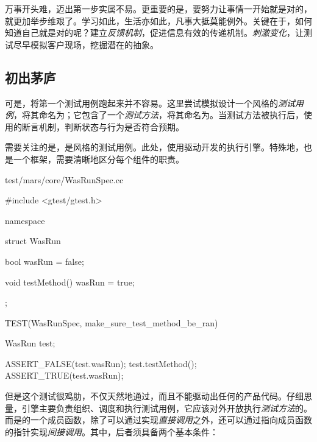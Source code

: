 \begin{content}

万事开头难，迈出第一步实属不易。更重要的是，要努力让事情一开始就是对的，就更加举步维艰了。学习如此，生活亦如此，凡事大抵莫能例外。关键在于，如何知道自己就是对的呢？建立\emph{反馈机制}，促进信息有效的传递机制。\emph{刺激变化}，让测试尽早模拟客户现场，挖掘潜在的抽象。

\subsection{初出茅庐}

可是，将第一个测试用例跑起来并不容易。这里尝试模拟设计一个风格的\emph{测试用例}，将其命名为；它包含了一个\emph{测试方法}，将其命名为。当测试方法被执行后，使用的断言机制，判断状态与行为是否符合预期。

需要关注的是，是风格的测试用例。此处，使用驱动开发的执行引擎。特殊地，也是一个框架，需要清晰地区分每个组件的职责。

\begin{nodiff}{test/mars/core/WasRunSpec.cc}
\begin{c++}
#include <gtest/gtest.h>

namespace {
  struct WasRun {
    bool wasRun = false;

    void testMethod() {
      wasRun = true;
    }
  };
}

TEST(WasRunSpec, make_sure_test_method_be_ran) {
  WasRun test;

  ASSERT_FALSE(test.wasRun);
  test.testMethod();
  ASSERT_TRUE(test.wasRun);
}
\end{c++}
\end{nodiff}

但是这个测试很鸡肋，不仅天然地通过，而且不能驱动出任何的产品代码。仔细思量，引擎主要负责组织、调度和执行测试用例，它应该对外开放执行\emph{测试方法}的。而是的一个成员函数，除了可以通过实现\emph{直接调用}之外，还可以通过指向成员函数的指针实现\emph{间接调用}。其中，后者须具备两个基本条件：

\begin{enum}
\end{enum}


\end{content}
